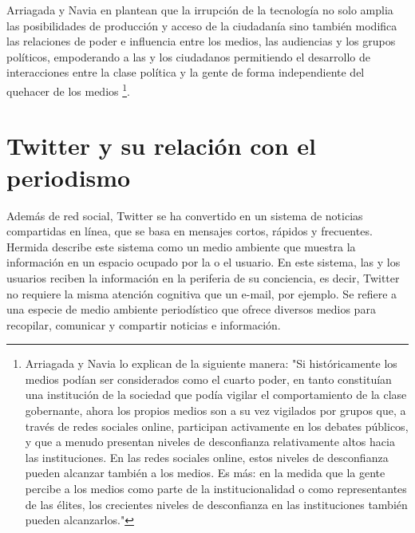 Arriagada y Navia en \cite{intermedio2013} plantean que la irrupción de la tecnología no solo amplia las posibilidades de producción y acceso de la ciudadanía sino también modifica las relaciones de poder e influencia entre los medios, las audiencias y los grupos políticos, empoderando a las y los ciudadanos permitiendo el desarrollo de interacciones entre la clase política y la gente de forma independiente del quehacer de los medios \footnote{ Arriagada y Navia lo explican de la siguiente manera: "Si históricamente los medios podían ser considerados como el cuarto poder, en tanto constituían una institución de la sociedad que podía vigilar el comportamiento de la clase gobernante, ahora los propios medios son a su vez vigilados por grupos que, a través de redes sociales online, participan activamente en los debates públicos, y que a menudo presentan niveles de desconfianza relativamente altos hacia las instituciones. En las redes sociales online, estos niveles de desconfianza pueden alcanzar también a los medios. Es más: en la medida que la gente percibe a los medios como parte de la institucionalidad o como representantes de las élites, los crecientes niveles de desconfianza en las instituciones también pueden alcanzarlos." }.
\newpage

\section{Twitter y su relación con el periodismo}

Además de red social, Twitter se ha convertido en un sistema de noticias compartidas en línea, que se basa en mensajes cortos, rápidos y frecuentes. Hermida \cite{hermida2010twittering}
describe este sistema como un medio ambiente que muestra la información en un espacio ocupado por la o el usuario.
En este sistema, las y los usuarios reciben la información en la periferia de su conciencia, es decir, Twitter no requiere la misma atención cognitiva que un e-mail, por ejemplo. Se refiere a una especie de medio ambiente periodístico que ofrece diversos medios para recopilar, comunicar y compartir noticias e información. 


